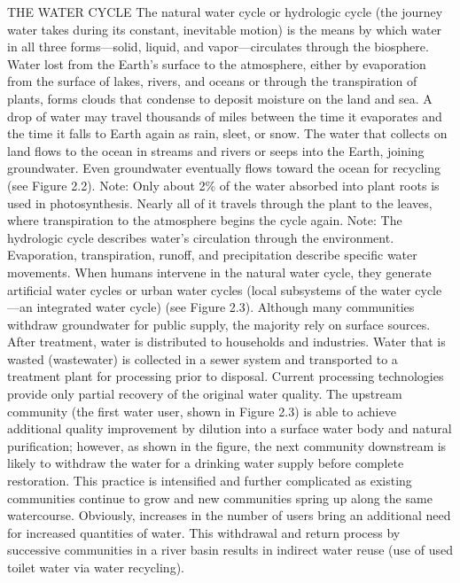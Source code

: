\documentclass{article}
\begin{document}
THE WATER CYCLE The natural water cycle or hydrologic cycle (the journey
water takes during its constant, inevitable motion) is the means by
which water in all three forms---solid, liquid, and vapor---circulates
through the biosphere. Water lost from the Earth's surface to the
atmosphere, either by evaporation from the surface of lakes, rivers, and
oceans or through the transpiration of plants, forms clouds that
condense to deposit moisture on the land and sea. A drop of water may
travel thousands of miles between the time it evaporates and the time it
falls to Earth again as rain, sleet, or snow. The water that collects on
land flows to the ocean in streams and rivers or seeps into the Earth,
joining groundwater. Even groundwater eventually flows toward the ocean
for recycling (see Figure 2.2). Note: Only about 2\% of the water
absorbed into plant roots is used in photosynthesis. Nearly all of it
travels through the plant to the leaves, where transpiration to the
atmosphere begins the cycle again. Note: The hydrologic cycle describes
water's circulation through the environment. Evaporation, transpiration,
runoff, and precipitation describe specific water movements. When humans
intervene in the natural water cycle, they generate artificial water
cycles or urban water cycles (local subsystems of the water cycle---an
integrated water cycle) (see Figure 2.3). Although many communities
withdraw groundwater for public supply, the majority rely on surface
sources. After treatment, water is distributed to households and
industries. Water that is wasted (wastewater) is collected in a sewer
system and transported to a treatment plant for processing prior to
disposal. Current processing technologies provide only partial recovery
of the original water quality. The upstream community (the first water
user, shown in Figure 2.3) is able to achieve additional quality
improvement by dilution into a surface water body and natural
purification; however, as shown in the figure, the next community
downstream is likely to withdraw the water for a drinking water supply
before complete restoration. This practice is intensified and further
complicated as existing communities continue to grow and new communities
spring up along the same watercourse. Obviously, increases in the number
of users bring an additional need for increased quantities of water.
This withdrawal and return process by successive communities in a river
basin results in indirect water reuse (use of used toilet water via
water recycling).
\end{document}
